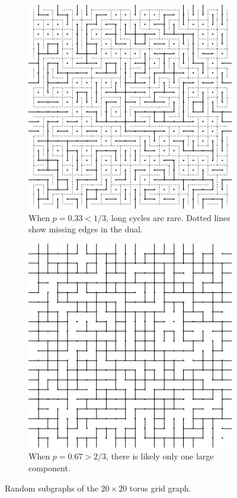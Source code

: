 \documentclass[format=acmsmall, review=false, screen=true]{acmart}
\begin{document}
\begin{figure}
  \centering
  \begin{subfigure}[t]{0.45\textwidth}
    \includegraphics{torusrare}
    \caption{When $p = 0.33 < 1/3$, long cycles are rare. Dotted lines show
      missing edges in the dual.}
  \end{subfigure}
  \quad\quad
  \begin{subfigure}[t]{0.45\textwidth}
    \includegraphics{torusdense}
    \caption{When $p = 0.67 > 2/3$, there is likely only one large
      component.}
  \end{subfigure}
  \caption{Random subgraphs of the $20 \times 20$ torus grid graph.}
\end{figure}
\end{document}

